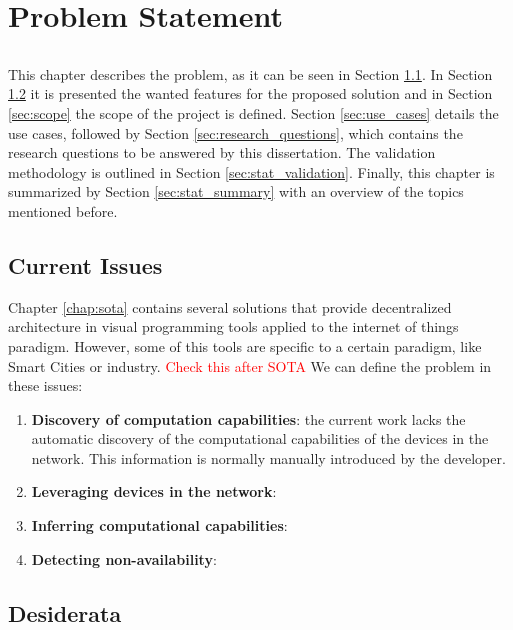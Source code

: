 \chapter{Problem Statement} \label{chap:problem_statement}

\section*{}

This chapter describes the problem, as it can be seen in Section \ref{sec:current_issues}. In Section \ref{sec:disiderata} it is presented the wanted features for the proposed solution and in Section \ref{sec:scope} the scope of the project is defined. Section \ref{sec:use_cases} details the use cases, followed by Section \ref{sec:research_questions}, which contains the research questions to be answered by this dissertation. The validation methodology is outlined in Section \ref{sec:stat_validation}. Finally, this chapter is summarized by Section \ref{sec:stat_summary} with an overview of the topics mentioned before.

\section{Current Issues}\label{sec:current_issues}

Chapter \ref{chap:sota} contains several solutions that provide decentralized architecture in visual programming tools applied to the internet of things paradigm. However, some of this tools are specific to a certain paradigm, like Smart Cities or industry. \textcolor{red}{Check this after SOTA}
We can define the problem in these issues:
\begin{enumerate}
    \item \textbf{Discovery of computation capabilities}: the current work lacks the automatic discovery of the computational capabilities of the devices in the network. This information is normally manually introduced by the developer.
    \item \textbf{Leveraging devices in the network}:
    \item \textbf{Inferring computational capabilities}: 
    \item \textbf{Detecting non-availability}:
\end{enumerate}

\section{Desiderata}\label{sec:disiderata}

